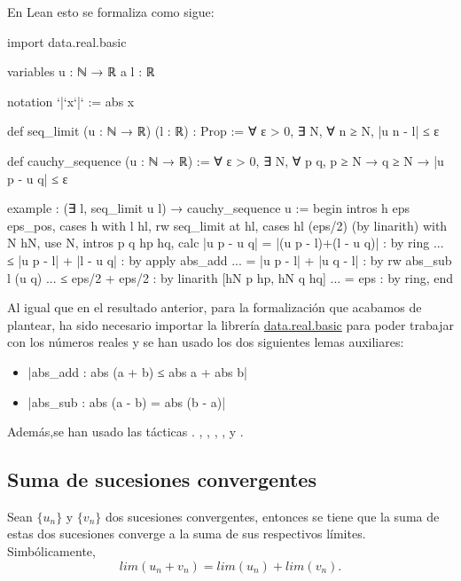 En Lean esto se formaliza como sigue:
\begin{leancode}
import data.real.basic

variables {u : ℕ → ℝ} {a l : ℝ}

notation `|`x`|` := abs x

def seq_limit (u : ℕ → ℝ) (l : ℝ) : Prop :=
∀ ε > 0, ∃ N, ∀ n ≥ N, |u n - l| ≤ ε

def cauchy_sequence (u : ℕ → ℝ) :=
∀ ε > 0, ∃ N, ∀ p q, p ≥ N → q ≥ N → |u p - u q| ≤ ε

example : (∃ l, seq_limit u l) → cauchy_sequence u :=
begin
  intros h eps eps_pos,
  cases h with l hl,
  rw seq_limit at hl,
  cases hl (eps/2) (by linarith) with N hN,
  use N,
    intros p q hp hq,
  calc  |u p - u q|
      = |(u p - l)+(l - u q)|  : by ring
  ... ≤ |u p - l| + |l - u q|  : by apply abs_add
  ... = |u p - l| + |u q - l|  : by rw abs_sub l (u q)
  ... ≤ eps/2 + eps/2          : by linarith [hN p hp, hN q hq]
  ... = eps                    : by ring,
end
\end{leancode}

Al igual que en el resultado anterior, para la formalización que acabamos
de plantear, ha sido necesario importar la librería \href{https://github.com/leanprover-community/mathlib/blob/master/src/data/real/basic.lean}
{data.real.basic} para poder trabajar con los números reales y se han usado los dos siguientes lemas
auxiliares:
\begin{itemize}
\item {}|abs_add : abs (a + b) ≤ abs a + abs b|
\item {}|abs_sub : abs (a - b) = abs (b - a)|
\end{itemize}
Además,se han usado las tácticas
.
,
,
,
,
 y
.

\subsection{Suma de sucesiones convergentes}

\begin{teorema}
  Sean \(\{u_n\}\) y \(\{v_n\}\) dos sucesiones convergentes, entonces
  se tiene que la suma de estas dos sucesiones converge a la suma de sus
  respectivos límites. Simbólicamente,
  \begin{equation}
  lim (u_n + v_n) = lim (u_n) + lim (v_n).
  \end{equation}
\end{teorema}

